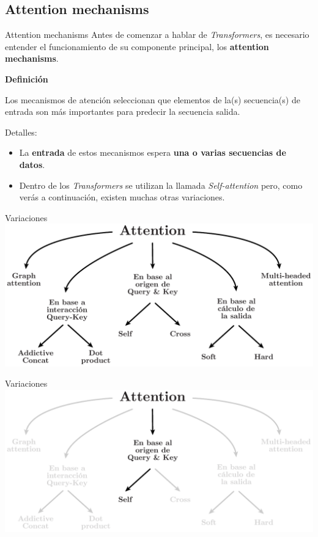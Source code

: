 \documentclass[aspectratio=169]{beamer}
\newenvironment{blockm}[1]{%
  \begin{block}{\textbf{#1}}%
  }{%
  \end{block}%
  \vspace{1em}%
}
\begin{document}
\subsection{Attention mechanisms}

\begin{frame}{Attention mechanisms}
  Antes de comenzar a hablar de \emph{Transformers}, es necesario entender el funcionamiento de su componente principal, los \textbf{attention mechanisms}.
  \vspace{.3cm}
  \begin{blockm}{Definición}
    Los mecanismos de atención seleccionan que elementos de la(s) secuencia(s) de entrada son más importantes para predecir la secuencia salida.
  \end{blockm}
  \vspace{.3cm}

  Detalles:
  \begin{itemize}
    \item  La \textbf{entrada} de estos mecanismos espera \textbf{una o varias secuencias de datos}.
    \item  Dentro de los \emph{Transformers} se utilizan la llamada \emph{Self-attention} pero, como verás a continuación, existen muchas otras variaciones.
  \end{itemize}

\end{frame}

\begin{frame}{Variaciones}
  \includegraphics[width=.85\textwidth, center]{imgs/tema4/att/AttOutline.pdf}
\end{frame}

\begin{frame}{Variaciones}
  \includegraphics[width=.85\textwidth, center]{imgs/tema4/att/AttOutline self.pdf}
\end{frame}
\end{document}
